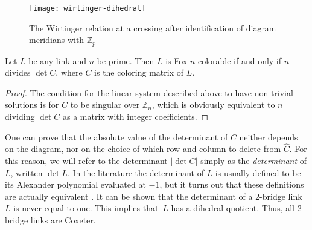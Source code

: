 \documentclass[main.tex]{subfiles}
\begin{document}
\begin{figure}[ht]
\centering
\texttt{[image: wirtinger-dihedral]}
\caption{The Wirtinger relation at a crossing after identification of diagram meridians with $\mathbb{Z}_p$}
\label{fig:wirtinger-dihedral}
\end{figure}


\begin{lemma}\label{lem:fox-coloring-and-determinant}
Let $L$ be any link and $n$ be prime. Then $L$ is Fox $n$-colorable if and only if $n$ divides $\det C$, where $C$ is the coloring matrix of $L$.
\end{lemma}

\begin{proof}
The condition for the linear system described above to have non-trivial solutions is for $C$ to be singular over $\mathbb{Z}_n$, which is obviously equivalent to $n$ dividing $\det C$ as a matrix with integer coefficients.
\end{proof}

One can prove that the absolute value of the determinant of $C$ neither depends on the diagram, nor on the choice of which row and column to delete from $\widehat{C}$. For this reason, we will refer to the determinant $|\det C|$ simply as the \textit{determinant} of $L$, written $\det L$. In the literature the determinant of $L$ is usually defined to be its Alexander polynomial evaluated at $-1$, but it turns out that these definitions are actually equivalent \cite{livingston1993}.
It can be shown \cite{lickorish1997}
that the determinant of a 2-bridge link $L$ is never equal to one. This implies that~$L$ has a dihedral quotient. Thus, all 2-bridge links are Coxeter.
\end{document}
